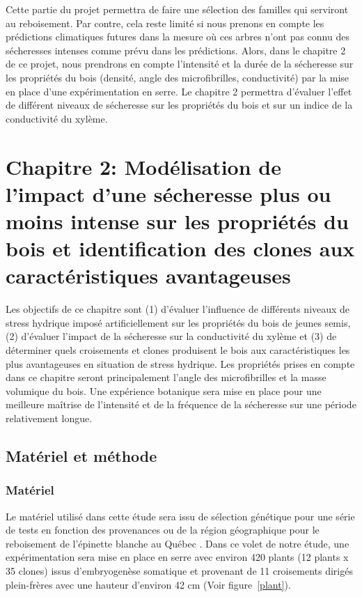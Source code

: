 \documentclass[a4paper,12pt]{report}
\begin{document}
Cette partie du projet permettra de faire une sélection des familles qui serviront au reboisement. Par contre, cela reste limité si nous prenons en compte les prédictions climatiques futures dans la mesure où ces arbres n'ont pas connu des sécheresses intenses comme prévu dans les prédictions. Alors, dans le chapitre 2 de ce projet, nous prendrons en compte l'intensité et la durée de la sécheresse sur les propriétés du bois (densité, angle des microfibrilles, conductivité) par la mise en place d'une expérimentation en serre. Le chapitre 2 permettra d'évaluer l'effet de différent niveaux de sécheresse sur les propriétés du bois et sur un indice de la conductivité du xylème.



\chapter{Chapitre 2: Modélisation de l'impact d'une sécheresse plus ou moins intense sur les propriétés du bois et identification des clones aux caractéristiques avantageuses}

Les objectifs de ce chapitre sont (1) d'évaluer l'influence de différents niveaux de stress hydrique imposé artificiellement sur les propriétés du bois de jeunes semis, (2) d'évaluer l'impact de la sécheresse sur la conductivité du xylème et (3) de déterminer quels croisements et clones produisent le bois aux caractéristiques les plus avantageuses en situation de stress hydrique. Les propriétés prises en compte dans ce chapitre seront principalement l'angle des microfibrilles et la masse volumique du bois. Une expérience botanique sera mise en place pour une meilleure maîtrise de l'intensité et de la fréquence de la sécheresse sur une période relativement longue.   


\section{Matériel et méthode}

\subsection*{Matériel}

Le matériel utilisé dans cette étude sera issu de sélection génétique pour une série de tests en fonction des provenances ou de la région géographique pour le reboisement de l'épinette blanche au Québec \citep{Beaulieu1996}. Dans ce volet de notre étude, une expérimentation sera mise en place en serre avec environ 420 plants (12 plants x 35 clones) issus d'embryogenèse somatique et provenant de 11 croisements dirigés plein-frères avec une hauteur d'environ 42 cm (Voir figure~\ref{plant}).  \\
\end{document}

